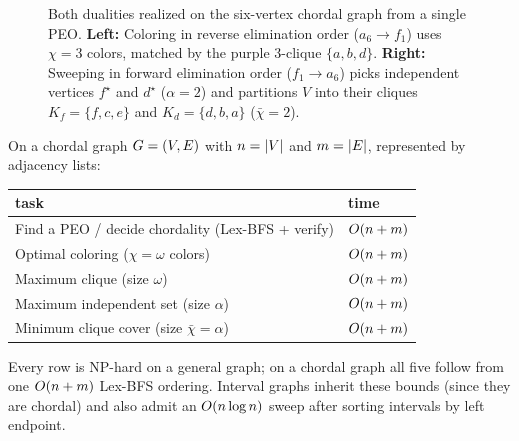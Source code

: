 \begin{figure}[htbp]
\caption{Both dualities realized on the six-vertex chordal graph from a single PEO. \textbf{Left:} Coloring in reverse elimination order ($a_6\to f_1$) uses $\chi=3$ colors, matched by the purple $3$-clique $\{a,b,d\}$. \textbf{Right:} Sweeping in forward elimination order ($f_1\to a_6$) picks independent vertices $f^\star$ and $d^\star$ ($\alpha=2$) and partitions $V$ into their cliques $K_f=\{f,c,e\}$ and $K_d=\{d,b,a\}$ ($\bar\chi=2$).}
\label{ch30:fig-peo-duals}
\end{figure}

\begin{complexitybox}
On a chordal graph $G=(V,E)$ with $n=\lvert V\rvert$ and $m=\lvert E\rvert$, represented by adjacency lists:
\begin{center}
\begin{tabular}{ll}
\toprule
task & time \\
\midrule
Find a PEO / decide chordality (Lex-BFS + verify) & $O(n+m)$ \\
Optimal coloring ($\chi=\omega$ colors) & $O(n+m)$ \\
Maximum clique (size $\omega$) & $O(n+m)$ \\
Maximum independent set (size $\alpha$) & $O(n+m)$ \\
Minimum clique cover (size $\bar\chi=\alpha$) & $O(n+m)$ \\
\bottomrule
\end{tabular}
\end{center}
Every row is $\mathrm{NP}$-hard on a general graph; on a chordal graph all five follow from one $O(n+m)$ Lex-BFS ordering. Interval graphs inherit these bounds (since they are chordal) and also admit an $O(n\log n)$ sweep after sorting intervals by left endpoint.
\end{complexitybox}

